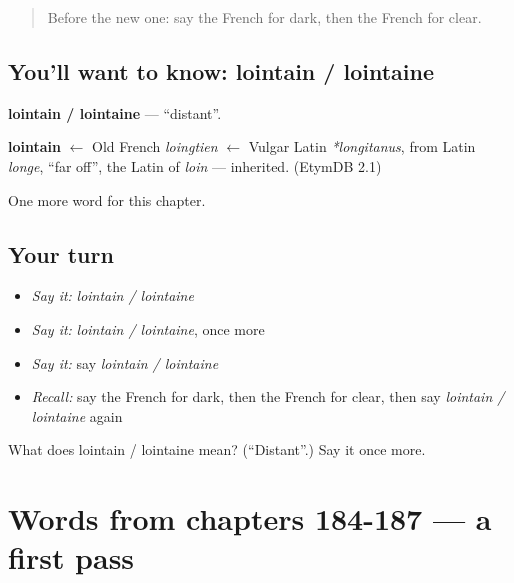 \label{lesson:FR-C192-lointain-lointaine}



\begin{quote}
Before the new one: say the French for dark, then the French for clear.
\end{quote}

\subsection*{You'll want to know: lointain / lointaine}
\textbf{lointain / lointaine} — \textquotedblleft{}distant\textquotedblright{}.

\begin{cousinweb}
\textbf{lointain} $\leftarrow$ Old French \emph{loingtien} $\leftarrow$ Vulgar Latin \emph{*longitanus}, from Latin \emph{longe}, \textquotedblleft{}far off\textquotedblright{}, the Latin of \emph{loin} — inherited. (EtymDB 2.1)
\end{cousinweb}

\begin{grammarlens}[title={What you've built}]
One more word for this chapter.
\end{grammarlens}

\subsection*{Your turn}
\begin{itemize}
\raggedright
  \item \emph{Say it:} \emph{lointain / lointaine}
  \item \emph{Say it:} \emph{lointain / lointaine}, once more
  \item \emph{Say it:} say \emph{lointain / lointaine}
  \item \emph{Recall:} say the French for dark, then the French for clear, then say \emph{lointain / lointaine} again
\end{itemize}

\begin{tcolorbox}[breakable,colback=teal!4,colframe=teal!35!black,title={Before you move on}]
What does lointain / lointaine mean? (\textquotedblleft{}Distant\textquotedblright{}.) Say it once more.
\end{tcolorbox}
\section[(dialogue)]{Words from chapters 184-187 — a first pass}

